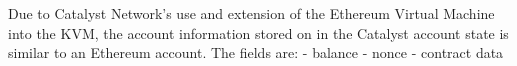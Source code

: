 Due to Catalyst Network’s use and extension of the Ethereum Virtual Machine into the KVM, the account information stored on in the Catalyst account state is similar to an Ethereum account. The fields are:
- balance
- nonce
- contract data

